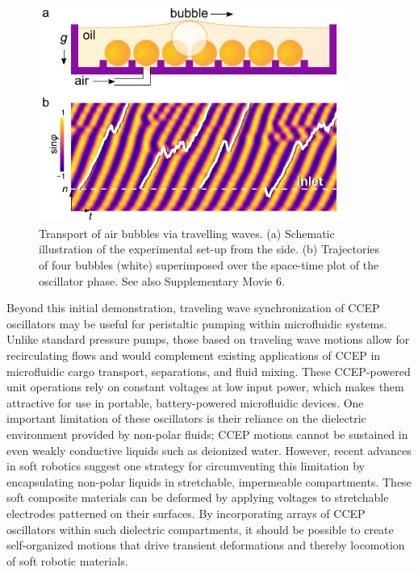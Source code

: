 \begin{figure}[h]
    \centering
    \includegraphics[width=10cm]{figures/3_4.pdf}
    \caption{Transport of air bubbles via travelling waves. (a) Schematic illustration of the experimental set-up from the side. (b) Trajectories of four bubbles (white) superimposed over the space-time plot of the oscillator phase. See also Supplementary Movie 6.}
    \label{fig:3.5}
\end{figure}
Beyond this initial demonstration, traveling wave synchronization of CCEP oscillators may be useful for peristaltic pumping within microfluidic systems. Unlike standard pressure pumps, those based on traveling wave motions allow for recirculating flows\autocite{mi5020289} and would complement existing  applications of CCEP in microfluidic cargo transport\autocite{drews2013ratcheted,cartier2017electric}, separations\autocite{drews2013ratcheted}, and fluid mixing\autocite{cartier2014microfluidic}. These CCEP-powered unit operations rely on constant voltages at low input power, which makes them attractive for use in portable, battery-powered microfluidic devices\autocite{bishop2018contact}.  One important limitation of these oscillators is their reliance on the dielectric environment provided by non-polar fluids; CCEP motions cannot be sustained in even weakly conductive liquids such as deionized water\autocite{cartier2014microfluidic}. However, recent advances in soft robotics suggest one strategy for circumventing this limitation by encapsulating non-polar liquids in stretchable, impermeable compartments\autocite{acome2018hydraulically}. These soft composite materials can be deformed by applying voltages to stretchable electrodes patterned on their surfaces.  By incorporating arrays of CCEP oscillators within such dielectric compartments, it should be possible to create self-organized motions that drive transient deformations and thereby locomotion of soft robotic materials.
